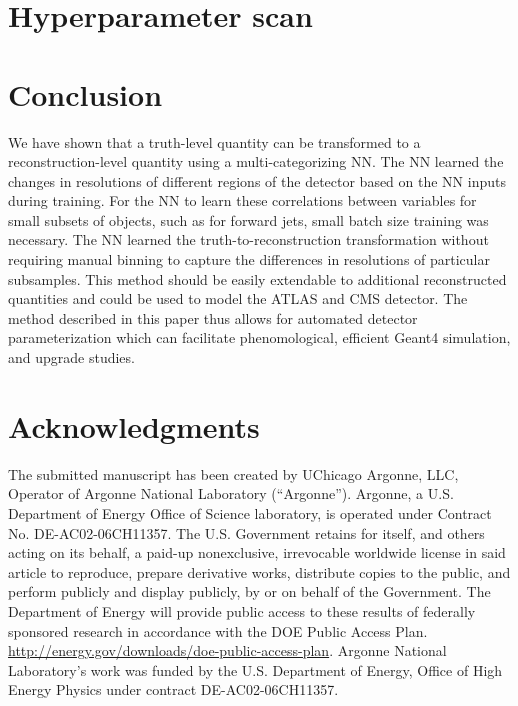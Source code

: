 \documentclass[showpacs,showkeys,preprint,prd,nofootinbib,linenumbers,12pt]{revtex4-1}
\begin{document}
\section{Hyperparameter scan}


\section{Conclusion}

We have shown that a truth-level quantity can be transformed to a reconstruction-level quantity using a multi-categorizing NN. The NN learned the changes in resolutions of different regions of the detector based on the NN inputs during training. For the NN to learn these correlations between variables for small subsets of objects, such as for forward jets, small batch size training was necessary. The NN learned the truth-to-reconstruction transformation without requiring manual binning to capture the differences in resolutions of particular subsamples. This method should be easily extendable to additional reconstructed quantities and could be used to model the ATLAS and CMS detector. The method described in this paper thus allows for automated detector parameterization which can facilitate phenomological, efficient Geant4 simulation, and upgrade studies. 

\section*{Acknowledgments}
The submitted manuscript has been created by UChicago Argonne, LLC, Operator of Argonne National Laboratory (“Argonne”). Argonne, a U.S.  Department of Energy Office of Science laboratory, is operated under Contract No. DE-AC02-06CH11357. The U.S. Government retains for itself, 
and others acting on its behalf, a paid-up nonexclusive, irrevocable worldwide license in said article to reproduce, prepare derivative works, distribute copies to the public, and perform publicly and display publicly, by or on behalf of the Government.  The Department of Energy will provide public access to these results of federally sponsored research in accordance with the 
DOE Public Access Plan. \url{http://energy.gov/downloads/doe-public-access-plan}. Argonne National Laboratory’s work was funded by the U.S. Department of Energy, Office of High Energy Physics under contract DE-AC02-06CH11357. 



\end{document}
